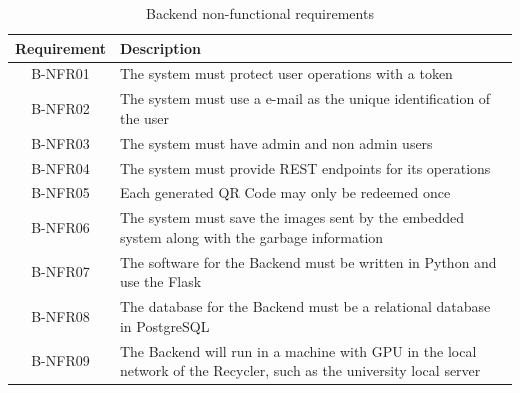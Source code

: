 \documentclass[a4paper,11pt]{article}
\begin{document}
\begin{table}[H]
  \caption{\small{Backend non-functional requirements}}
  \begin{center}
    \begin{tabular}{|c|p{95mm}|}
      \hline
      Requirement & Description                                                                                                          \\ \hline
      B-NFR01     & The system must protect user operations with a token                                                                 \\ \hline
      B-NFR02     & The system must use a e-mail as the unique identification of the user                                                \\ \hline
      B-NFR03     & The system must have admin and non admin users                                                                       \\ \hline
      B-NFR04     & The system must provide REST endpoints for its operations                                                            \\ \hline
      B-NFR05     & Each generated QR Code may only be redeemed once                                                                     \\ \hline
      B-NFR06     & The system must save the images sent by the embedded system along with the garbage information                       \\ \hline
      B-NFR07     & The software for the Backend must be written in Python and use the Flask                                             \\ \hline
      B-NFR08     & The database for the Backend must be a relational database in PostgreSQL                                             \\ \hline
      B-NFR09     & The Backend will run in a machine with GPU in the local network of the Recycler, such as the university local server \\ \hline
    \end{tabular}
  \end{center}
  \label{tab:back1}
\end{table}
\end{document}
